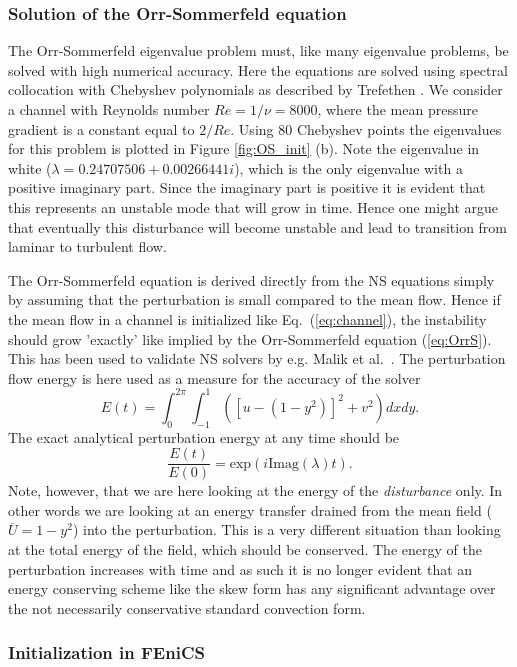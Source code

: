 \subsubsection{Solution of the Orr-Sommerfeld equation}

The Orr-Sommerfeld eigenvalue problem must, like many eigenvalue problems, be solved with high numerical accuracy. Here the equations are solved using spectral collocation with Chebyshev polynomials as described by Trefethen \cite{tref06}. We consider a channel with Reynolds number $Re=1/\nu=8000$, where the mean pressure gradient is a constant equal to $2/Re$. Using 80 Chebyshev points the eigenvalues for this problem is plotted in Figure \ref{fig:OS_init} (b). Note the eigenvalue in white ($\lambda = 0.24707506+0.00266441 i$), which is the only eigenvalue with a positive imaginary part. Since the imaginary part is positive it is evident that this represents an unstable mode that will grow in time. Hence one might argue that eventually this disturbance will become unstable and lead to transition from laminar to turbulent flow.

The Orr-Sommerfeld equation is derived directly from the NS equations simply by assuming that the perturbation is small compared to the mean flow. Hence if the mean flow in a channel is initialized like Eq.~(\ref{eq:channel}), the instability should grow 'exactly' like implied by the Orr-Sommerfeld equation (\ref{eq:OrrS}). This has been used to validate NS solvers by e.g. Malik et al.~\cite{Malik1984}. The perturbation flow energy is here used as a measure for the accuracy of the solver
\begin{equation}
  E(t)= \int_0^{2\pi}\int_{-1}^{1} \left( \left[u-(1-y^2)\right]^2 + v^2 \right) dx dy.
\end{equation}
The exact analytical perturbation energy at any time should be 
\[ \frac{E(t)}{E(0)}=\text{exp}(i \text{Imag}(\lambda) t).\]
Note, however, that we are here looking at the energy of the \textit{disturbance} only. In other words we are looking at an energy transfer drained from the mean field ($\overline{U}=1-y^2$) into the perturbation. This is a very different situation than looking at the total energy of the field, which should be conserved. The energy of the perturbation increases with time and as such it is no longer evident that an energy conserving scheme like the skew form has any significant advantage over the not necessarily conservative standard convection form.

\subsubsection{Initialization in FEniCS}

